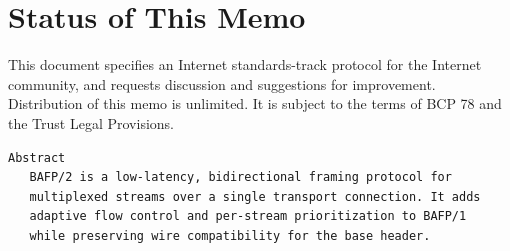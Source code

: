 \section*{Status of This Memo}
\vspace{-4pt}
{\small This document specifies an Internet standards-track protocol for the Internet
community, and requests discussion and suggestions for improvement. Distribution of this
memo is unlimited. It is subject to the terms of BCP 78 and the Trust Legal Provisions.}

\begin{lstlisting}
Abstract
   BAFP/2 is a low-latency, bidirectional framing protocol for
   multiplexed streams over a single transport connection. It adds
   adaptive flow control and per-stream prioritization to BAFP/1
   while preserving wire compatibility for the base header.
\end{lstlisting}
